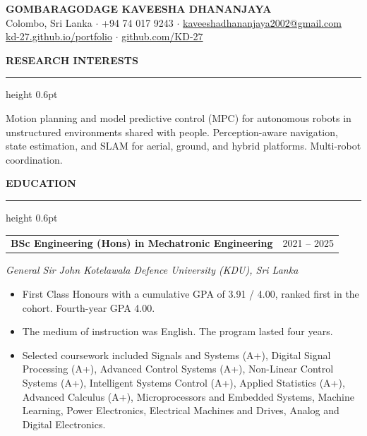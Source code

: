 \documentclass[11pt,letterpaper]{article}
\makeatletter
\renewcommand{\section}[1]{%
  \Needspace{6\baselineskip}%
  \vspace{7pt}%
  {\normalsize\bfseries\MakeUppercase{#1}}\par
  \vspace{1pt}\hrule height 0.6pt
  \vspace{3.5pt}%
}
\newcommand{\cventry}[2]{%
  \vspace{3pt}%
  \noindent\begin{tabularx}{\textwidth}{@{}X r@{}}
    #1 & #2
  \end{tabularx}\par\vspace{-0.5pt}%
}
\newcommand{\cvsub}[1]{{\itshape #1}\par\vspace{1pt}}
\newenvironment{cvlist}
  {\begin{itemize}[leftmargin=1.1em,itemsep=1pt,parsep=0pt,topsep=1.5pt,
                   label=\textendash]}
  {\end{itemize}}
\makeatother
\begin{document}
\begin{center}
  {\LARGE\bfseries GOMBARAGODAGE KAVEESHA DHANANJAYA}\\[4pt]
  Colombo, Sri Lanka $\cdot$ +94 74 017 9243 $\cdot$
  \href{mailto:kaveeshadhananjaya2002@gmail.com}{kaveeshadhananjaya2002@gmail.com}\\[2pt]
  \href{https://kd-27.github.io/portfolio/}{kd-27.github.io/portfolio} $\cdot$
  \href{https://github.com/KD-27}{github.com/KD-27}
\end{center}

\section{Research Interests}

Motion planning and model predictive control (MPC) for autonomous robots in
unstructured environments shared with people. Perception-aware navigation, state
estimation, and SLAM for aerial, ground, and hybrid platforms. Multi-robot
coordination.

\section{Education}

\cventry{\textbf{BSc Engineering (Hons) in Mechatronic Engineering}}{2021 -- 2025}
\cvsub{General Sir John Kotelawala Defence University (KDU), Sri Lanka}
\begin{cvlist}
  \item First Class Honours with a cumulative GPA of 3.91 / 4.00, ranked first in
        the cohort. Fourth-year GPA 4.00.
  \item The medium of instruction was English. The program lasted four years.
  \item Selected coursework included Signals and Systems (A+), Digital Signal Processing
        (A+), Advanced Control Systems (A+), Non-Linear Control Systems (A+),
        Intelligent Systems Control (A+), Applied Statistics (A+), Advanced
        Calculus (A+), Microprocessors and Embedded Systems, Machine Learning,
        Power Electronics, Electrical Machines and Drives, Analog and Digital
        Electronics.
\end{cvlist}

\end{document}
